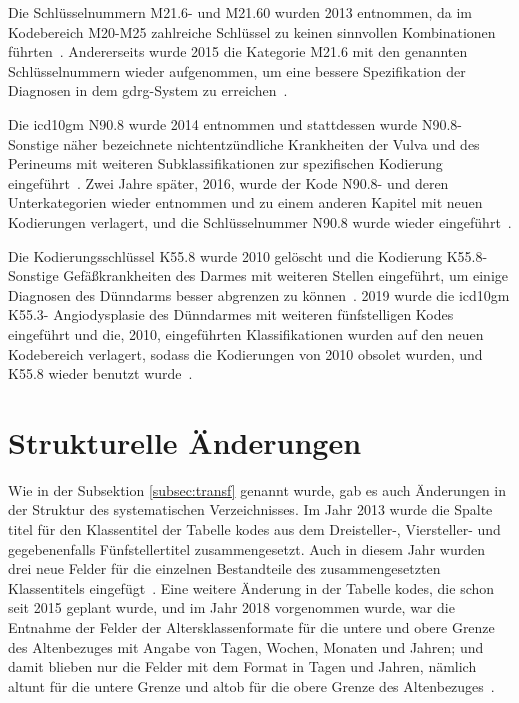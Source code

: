 Die Schlüsselnummern \textsf{M21.6-} und \textsf{M21.60} wurden 2013 entnommen, da im Kodebereich \textsf{M20-M25} zahlreiche Schlüssel zu keinen sinnvollen Kombinationen führten~\cite{dele13}. Andererseits wurde 2015 die Kategorie \textsf{M21.6} mit den genannten Schlüsselnummern wieder aufgenommen, um eine bessere Spezifikation der Diagnosen in dem \ac{gdrg}-System zu erreichen~\cite{komm15}. 

Die \ac{icd10gm} \textsf{N90.8} wurde 2014 entnommen und stattdessen wurde \textsf{N90.8-} \textsf{Sonstige näher bezeichnete nichtentzündliche Krankheiten der Vulva und des Perineums} mit weiteren Subklassifikationen zur spezifischen Kodierung eingeführt~\cite{komm14}. Zwei Jahre später, 2016, wurde der Kode \textsf{N90.8-} und deren Unterkategorien wieder entnommen und zu einem anderen Kapitel mit neuen Kodierungen verlagert, und die Schlüsselnummer \textsf{N90.8} wurde wieder eingeführt~\cite{komm16}.

Die Kodierungsschlüssel \textsf{K55.8} wurde 2010 gelöscht und die Kodierung \textsf{K55.8-} \textsf{Sonstige Gefäßkrankheiten des Darmes} mit weiteren Stellen eingeführt, um einige Diagnosen des Dünndarms besser abgrenzen zu können~\cite{komm10}. 2019 wurde die \ac{icd10gm} \textsf{K55.3-} \textsf{Angiodysplasie des Dünndarmes} mit weiteren fünfstelligen Kodes eingeführt und die, 2010, eingeführten Klassifikationen wurden auf den neuen Kodebereich verlagert, sodass die Kodierungen von 2010 obsolet wurden, und \textsf{K55.8} wieder benutzt wurde~\cite{komm19}.

\section{Strukturelle Änderungen} \label{sec:strucmodif}

Wie in der Subsektion \ref{subsec:transf} genannt wurde, gab es auch Änderungen in der Struktur des systematischen Verzeichnisses. Im Jahr 2013 wurde die Spalte \glqq\textsf{titel}\grqq{} für den Klassentitel der Tabelle \glqq\textsf{kodes}\grqq{} aus dem Dreisteller-, Viersteller- und gegebenenfalls Fünfstellertitel zusammengesetzt. Auch in diesem Jahr wurden drei neue Felder für die einzelnen Bestandteile des zusammengesetzten Klassentitels eingefügt~\cite{readme13}. Eine weitere Änderung in der Tabelle \glqq\textsf{kodes}\grqq{}, die schon seit 2015 geplant wurde, und im Jahr 2018 vorgenommen wurde, war die Entnahme der Felder der Altersklassenformate für die untere und obere Grenze des Altenbezuges mit Angabe von Tagen, Wochen, Monaten und Jahren; und damit blieben nur die Felder mit dem Format in Tagen und Jahren, nämlich  \glqq\textsf{altunt}\grqq{} für die untere Grenze und \glqq\textsf{altob}\grqq{} für die obere Grenze des Altenbezuges~\cite{readme17}.
